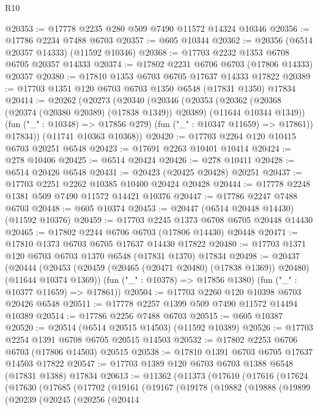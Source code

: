 \begin{lexlean}{R10}
\begin{coremodule}
{{{{{{{{{{{{{{{{{{{{{{{{{{{{{{{{{{{{{{{{{{{{{{{{{{{{{{{{{{{{{{{{{{{{{{{{{{{{{{{{{{{{@20353 := @17778 @2235 @280 @509 @7490 @11572 @14324 @10346
@20356 := @17786 @2234 @7488 @6703
@20357 := @605 @10344
@20362 := @20356 (@6514 @20357 @14333) (@11592 @10346)
@20368 := @17703 @2232 @1353 @6708 @6705 @20357 @14333
@20374 := @17802 @2231 @6706 @6703 (@17806 @14333) @20357
@20380 := @17810 @1353 @6703 @6705 @17637 @14333 @17822
@20389 := @17703 @1351 @120 @6703 @6703 @1350 @6548 (@17831 @1350) @17834
@20414 := @20262
    (@20273
      (@20340
        (@20346
          (@20353
            (@20362 (@20368 (@20374 (@20380 @20389) (@17838 @1349)) @20389) (@11644 @10344 @1349))
            (fun ("_" : @10348) => @17856 @279)
            (fun ("_" : @10347 @11659) => @17861))
          @17834))
      (@11741 @10363 @10368))
@20420 := @17703 @2264 @120 @10415 @6703 @20251 @6548
@20423 := @17691 @2263 @10401 @10414
@20424 := @278 @10406
@20425 := @6514 @20424
@20426 := @278 @10411
@20428 := @6514 @20426 @6548
@20431 := @20423 (@20425 @20428) @20251
@20437 := @17703 @2251 @2262 @10385 @10400 @20424 @20428
@20444 := @17778 @2248 @1381 @509 @7490 @11572 @14421 @10376
@20447 := @17786 @2247 @7488 @6703
@20448 := @605 @10374
@20453 := @20447 (@6514 @20448 @14430) (@11592 @10376)
@20459 := @17703 @2245 @1373 @6708 @6705 @20448 @14430
@20465 := @17802 @2244 @6706 @6703 (@17806 @14430) @20448
@20471 := @17810 @1373 @6703 @6705 @17637 @14430 @17822
@20480 := @17703 @1371 @120 @6703 @6703 @1370 @6548 (@17831 @1370) @17834
@20498 := @20437
    (@20444
      (@20453 (@20459 (@20465 (@20471 @20480) (@17838 @1369)) @20480) (@11644 @10374 @1369))
      (fun ("_" : @10378) => @17856 @1380)
      (fun ("_" : @10377 @11659) => @17861))
@20504 := @17703 @2260 @120 @10398 @6703 @20426 @6548
@20511 := @17778 @2257 @1399 @509 @7490 @11572 @14494 @10389
@20514 := @17786 @2256 @7488 @6703
@20515 := @605 @10387
@20520 := @20514 (@6514 @20515 @14503) (@11592 @10389)
@20526 := @17703 @2254 @1391 @6708 @6705 @20515 @14503
@20532 := @17802 @2253 @6706 @6703 (@17806 @14503) @20515
@20538 := @17810 @1391 @6703 @6705 @17637 @14503 @17822
@20547 := @17703 @1389 @120 @6703 @6703 @1388 @6548 (@17831 @1388) @17834
@20613 := @11362
    (@11373
      (@17610
        (@17616
          (@17624
            (@17630
              (@17685
                (@17702
                  (@19161
                    (@19167
                      (@19178
                        (@19882
                          (@19888
                            (@19899
                              (@20239
                                (@20245
                                  (@20256
                                    (@20414
}}}}}}}}}}}}}}}}}}}}}}}}}}}}}}}}}}}}}}}}}}}}}}}}}}}}}}}}}}}}}}}}}}}}}}}}}}}}}}}}}}}}
\end{coremodule}
\end{lexlean}
